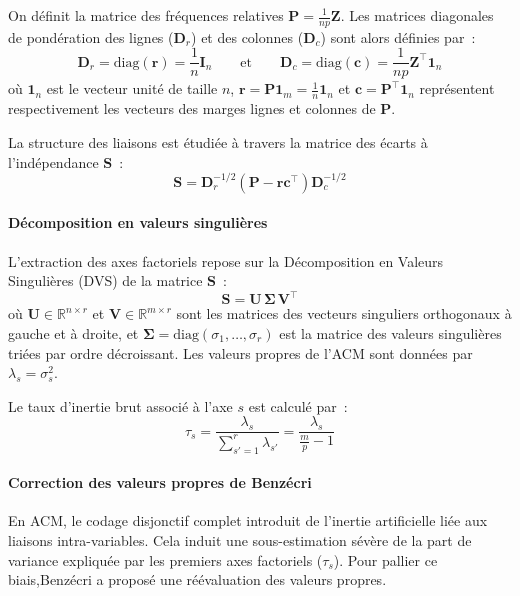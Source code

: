 \documentclass[12pt, a4paper, oneside]{report}
\begin{document}
\begin{enumerate}
	On définit la matrice des fréquences relatives $\mathbf{P} = \frac{1}{np}\mathbf{Z}$. Les matrices diagonales de pondération des lignes ($\mathbf{D}_r$) et des colonnes ($\mathbf{D}_c$) sont alors définies par~:
	\begin{equation}
		\mathbf{D}_r = \text{diag}(\mathbf{r}) = \frac{1}{n}\mathbf{I}_n \qquad \text{et} \qquad \mathbf{D}_c = \text{diag}(\mathbf{c}) = \frac{1}{np}\mathbf{Z}^{\top}\mathbf{1}_n
	\end{equation}
	où $\mathbf{1}_n$ est le vecteur unité de taille $n$, $\mathbf{r} = \mathbf{P}\mathbf{1}_m = \frac{1}{n}\mathbf{1}_n$ et $\mathbf{c} = \mathbf{P}^{\top}\mathbf{1}_n$ représentent respectivement les vecteurs des marges lignes et colonnes de $\mathbf{P}$.
	
	La structure des liaisons est étudiée à travers la matrice des écarts à l'indépendance $\mathbf{S}$~:
	\begin{equation}
		\mathbf{S} = \mathbf{D}_r^{-1/2} \left(\mathbf{P} - \mathbf{r}\mathbf{c}^{\top}\right) \mathbf{D}_c^{-1/2}
		\label{eq:ecarts}
	\end{equation}
	
	\paragraph{Décomposition en valeurs singulières}
	L'extraction des axes factoriels repose sur la Décomposition en Valeurs Singulières (DVS) de la matrice $\mathbf{S}$~:
	\begin{equation}
		\mathbf{S} = \mathbf{U}\,\boldsymbol{\Sigma}\,\mathbf{V}^{\top}
		\label{eq:svd}
	\end{equation}
	où $\mathbf{U} \in \mathbb{R}^{n \times r}$ et $\mathbf{V} \in \mathbb{R}^{m \times r}$ sont les matrices des vecteurs singuliers orthogonaux à gauche et à droite, et $\boldsymbol{\Sigma} = \mathrm{diag}(\sigma_1, \dots, \sigma_r)$ est la matrice des valeurs singulières triées par ordre décroissant. Les valeurs propres de l'ACM sont données par $\lambda_s = \sigma_s^2$.
	
	Le taux d'inertie brut associé à l'axe $s$ est calculé par~:
	\begin{equation}
		\tau_s = \frac{\lambda_s}{\sum_{s'=1}^{r} \lambda_{s'}} = \frac{\lambda_s}{\frac{m}{p} - 1}
		\label{eq:inertie_brute}
	\end{equation}
	\cite{saporta_2010}
	
	\paragraph{Correction des valeurs propres de Benzécri}
	En ACM, le codage disjonctif complet introduit de l'inertie artificielle liée aux liaisons intra-variables. Cela induit une sous-estimation sévère de la part de variance expliquée par les premiers axes factoriels ($\tau_s$). Pour pallier ce biais,Benzécri a proposé une réévaluation des valeurs propres.
	

\end{enumerate}
\end{document}
